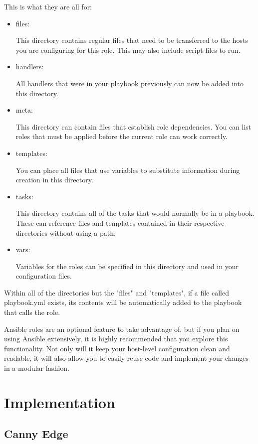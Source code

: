 \documentclass[BTech]{srmuthesis}
\begin{document}
This is what they are all for:

\begin{itemize}
    \item files: \par This directory contains regular files that need to be transferred to the hosts you are configuring for this role. This may also include script files to run.
    \item handlers: \par All handlers that were in your playbook previously can now be added into this directory.
    \item meta: \par This directory can contain files that establish role dependencies. You can list roles that must be applied before the current role can work correctly.
    \item templates: \par You can place all files that use variables to substitute information during creation in this directory.
    \item tasks: \par This directory contains all of the tasks that would normally be in a playbook. These can reference files and templates contained in their respective directories without using a path.
    \item vars: \par Variables for the roles can be specified in this directory and used in your configuration files.
\end{itemize}

Within all of the directories but the "files" and "templates", if a file called playbook.yml exists, its contents will be automatically added to the playbook that calls the role.

Ansible roles are an optional feature to take advantage of, but if you plan on using Ansible extensively, it is highly recommended that you explore this functionality. Not only will it keep your host-level configuration clean and readable, it will also allow you to easily reuse code and implement your changes in a modular fashion.

\chapter{Implementation}

\section{Canny Edge}
\end{document}
